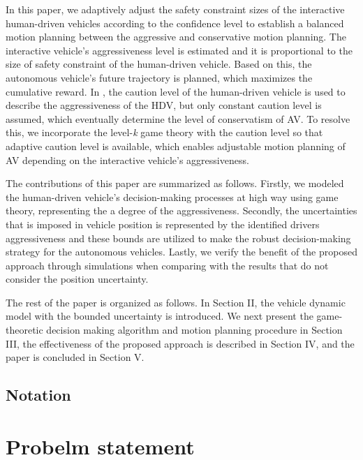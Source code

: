 \documentclass[10pt,journal]{IEEEtran}
\begin{document}
	In this paper, we adaptively adjust the safety constraint sizes of the interactive human-driven vehicles according to the confidence level to establish a balanced motion planning between the aggressive and conservative motion planning. The interactive vehicle's aggressiveness level is estimated and it is proportional to the size of safety constraint of the human-driven vehicle. Based on this, the autonomous vehicle's future trajectory is planned, which maximizes the cumulative reward. In \cite{Jin2019}, the caution level of the human-driven vehicle is used to describe the aggressiveness of the HDV, but only constant caution level is assumed, which eventually determine the level of conservatism of AV. To resolve this, we incorporate the level-\textit{k} game theory with the caution level so that adaptive caution level is available, which enables adjustable motion planning of AV depending on the interactive vehicle's aggressiveness.
	
	The contributions of this paper are summarized as follows. Firstly, we modeled the human-driven vehicle's decision-making processes at high way using game theory, representing the a degree of the aggressiveness. Secondly, the uncertainties that is imposed in vehicle position is represented by the identified drivers aggressiveness and these bounds are utilized to make the robust decision-making strategy for the autonomous vehicles. Lastly, we verify the benefit of the proposed approach through simulations when comparing with the results that do not consider the position uncertainty.
	
	The rest of the paper is organized as follows. In Section II, the vehicle dynamic model with the bounded uncertainty is introduced. We next present the game-theoretic decision making algorithm and motion planning procedure in Section III, the effectiveness of the proposed approach is described in Section IV, and the paper is concluded in Section V.
	
	\subsection{Notation}




	\section{Probelm statement}
	\label{sec:problem_statement}
	
\end{document}
